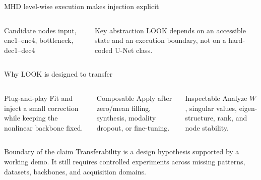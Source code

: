 \documentclass[aspectratio=169,11pt]{beamer}
\begin{document}
\begin{frame}{MHD level-wise execution makes injection explicit}
  \centering
  \vspace{5mm}
  \begin{columns}[T,onlytextwidth]
      \begin{exampleblock}{Candidate nodes}
        input, enc1--enc4, bottleneck, dec1--dec4
      \end{exampleblock}
      \begin{block}{Key abstraction}
        LOOK depends on an accessible state and an execution boundary, not on a hard-coded U-Net class.
      \end{block}
  \end{columns}
\end{frame}

\begin{frame}{Why LOOK is designed to transfer}
  \begin{columns}[T,onlytextwidth]
      \begin{exampleblock}{Plug-and-play}
        Fit and inject a small correction while keeping the nonlinear backbone fixed.
      \end{exampleblock}
      \begin{exampleblock}{Composable}
        Apply after zero/mean filling, synthesis, modality dropout, or fine-tuning.
      \end{exampleblock}
      \begin{exampleblock}{Inspectable}
        Analyze $W$, singular values, eigen-structure, rank, and node stability.
      \end{exampleblock}
  \end{columns}
  \vspace{5mm}
  \begin{alertblock}{Boundary of the claim}
    Transferability is a design hypothesis supported by a working demo. It still requires controlled
    experiments across missing patterns, datasets, backbones, and acquisition domains.
  \end{alertblock}
\end{frame}
\end{document}
